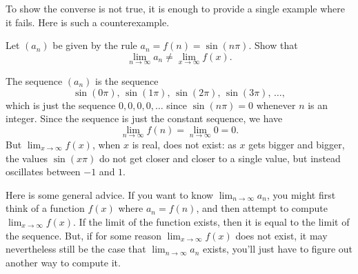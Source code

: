 \documentclass{ximera}
\begin{document}
To show the converse is not true, it is enough to provide a single
example where it fails.  Here is such a counterexample.

\begin{example}
  Let $(a_n)$ be given by the rule $a_n = f(n)=\sin(n\pi)$. Show that
  \[
  \lim_{n\to\infty} a_n \ne \lim_{x\to \infty}f(x).
  \]
  \begin{explanation}
  The sequence $(a_n)$ is the sequence
  \[
  \sin(0\pi),\, \sin(1\pi),\, \sin(2\pi),\,\sin(3\pi),\,\ldots,
  \]
which is just the sequence $0, 0, 0, 0, \ldots$ since $\sin(n\pi)=0$
whenever $n$ is an integer.  Since the sequence is just the constant
sequence, we have
\[
\lim_{n\to\infty} f(n)= \lim_{n\to\infty} 0 = 0. 
\]
But $\lim_{x\to\infty}f(x)$, when $x$ is real, does not exist: as $x$
gets bigger and bigger, the values $\sin(x\pi)$ do not get closer and
closer to a single value, but instead oscillates between $-1$ and $1$.
  \end{explanation}
\end{example}

Here is some general advice. If you want to know $\lim_{n\to\infty}
a_n$, you might first think of a function $f(x)$ where $a_n = f(n)$,
and then attempt to compute $\lim_{x\to\infty}f(x)$.  If the limit of
the function exists, then it is equal to the limit of the sequence.
But, if for some reason $\lim_{x\to\infty}f(x)$ does not exist, it may
nevertheless still be the case that $\lim_{n\to\infty}a_n$ exists,
you'll just have to figure out another way to compute it.







%
%
\end{document}
